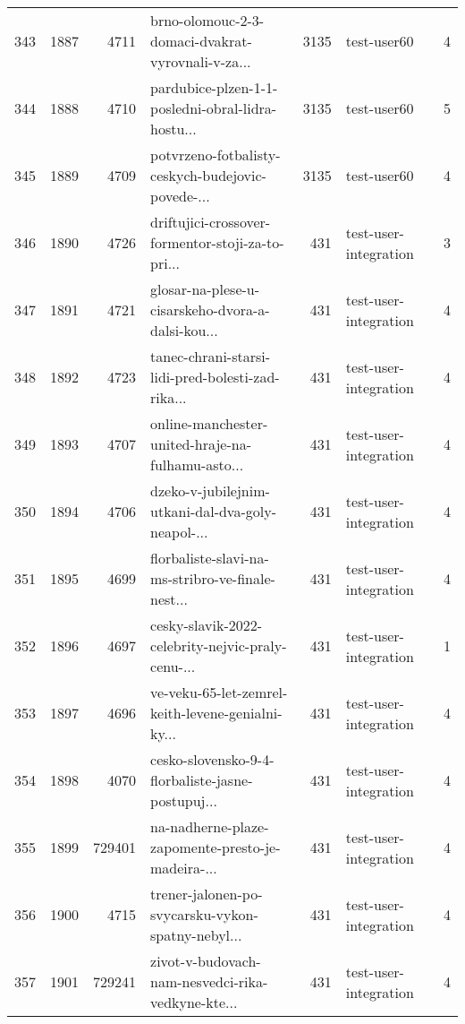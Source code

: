 \begin{tabular}{lrrlrlr}
343  &       1887 &     4711 &  brno-olomouc-2-3-domaci-dvakrat-vyrovnali-v-za... &     3135 &                  test-user60 &               4 \\
344  &       1888 &     4710 &  pardubice-plzen-1-1-posledni-obral-lidra-hostu... &     3135 &                  test-user60 &               5 \\
345  &       1889 &     4709 &  potvrzeno-fotbalisty-ceskych-budejovic-povede-... &     3135 &                  test-user60 &               4 \\
346  &       1890 &     4726 &  driftujici-crossover-formentor-stoji-za-to-pri... &      431 &        test-user-integration &               3 \\
347  &       1891 &     4721 &  glosar-na-plese-u-cisarskeho-dvora-a-dalsi-kou... &      431 &        test-user-integration &               4 \\
348  &       1892 &     4723 &  tanec-chrani-starsi-lidi-pred-bolesti-zad-rika... &      431 &        test-user-integration &               4 \\
349  &       1893 &     4707 &  online-manchester-united-hraje-na-fulhamu-asto... &      431 &        test-user-integration &               4 \\
350  &       1894 &     4706 &  dzeko-v-jubilejnim-utkani-dal-dva-goly-neapol-... &      431 &        test-user-integration &               4 \\
351  &       1895 &     4699 &  florbaliste-slavi-na-ms-stribro-ve-finale-nest... &      431 &        test-user-integration &               4 \\
352  &       1896 &     4697 &  cesky-slavik-2022-celebrity-nejvic-praly-cenu-... &      431 &        test-user-integration &               1 \\
353  &       1897 &     4696 &  ve-veku-65-let-zemrel-keith-levene-genialni-ky... &      431 &        test-user-integration &               4 \\
354  &       1898 &     4070 &  cesko-slovensko-9-4-florbaliste-jasne-postupuj... &      431 &        test-user-integration &               4 \\
355  &       1899 &   729401 &  na-nadherne-plaze-zapomente-presto-je-madeira-... &      431 &        test-user-integration &               4 \\
356  &       1900 &     4715 &  trener-jalonen-po-svycarsku-vykon-spatny-nebyl... &      431 &        test-user-integration &               4 \\
357  &       1901 &   729241 &  zivot-v-budovach-nam-nesvedci-rika-vedkyne-kte... &      431 &        test-user-integration &               4 \\

\end{tabular}
